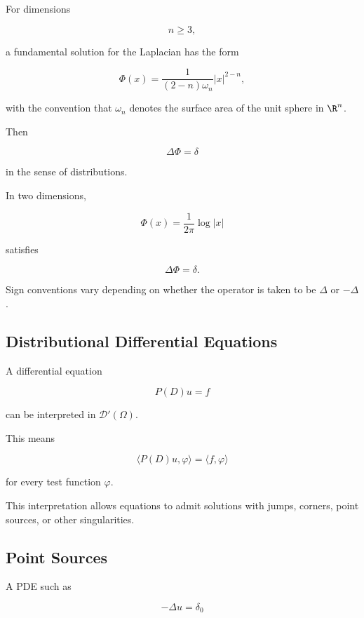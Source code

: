 For dimensions

\[
n\geq3,
\]

a fundamental solution for the Laplacian has the form

\[
\boxed{
\Phi(x)
=
\frac{1}{(2-n)\omega_n}
|x|^{2-n},
}
\]

with the convention that \(\omega_n\) denotes the surface area of the
unit sphere in \(\R^n\).

Then

\[
\boxed{
\Delta\Phi=\delta
}
\]

in the sense of distributions.

In two dimensions,

\[
\boxed{
\Phi(x)
=
\frac{1}{2\pi}\log|x|
}
\]

satisfies

\[
\boxed{
\Delta\Phi=\delta.
}
\]

Sign conventions vary depending on whether the operator is taken to be
\(\Delta\) or \(-\Delta\).

\subsection{Distributional Differential Equations}
\label{subsec:distributional-differential-equations}

A differential equation

\[
\boxed{
P(D)u=f
}
\]

can be interpreted in \(\mathcal{D}'(\Omega)\).

This means

\[
\boxed{
\langle P(D)u,\varphi\rangle
=
\langle f,\varphi\rangle
}
\]

for every test function \(\varphi\).

This interpretation allows equations to admit solutions with jumps,
corners, point sources, or other singularities.

\subsection{Point Sources}
\label{subsec:distribution-point-sources}

A PDE such as

\[
\boxed{
-\Delta u=\delta_0
}
\]

